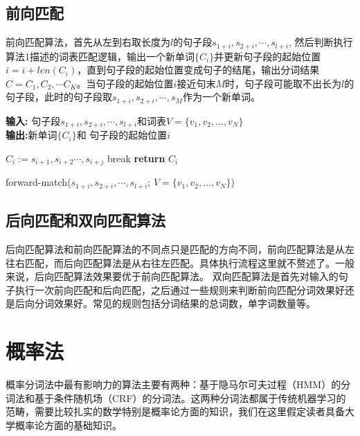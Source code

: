 \documentclass[twoside,a4paper,12pt]{book}%
\begin{document}
\subsection{前向匹配}
前向匹配算法，首先从左到右取长度为$l$的句子段$s_{1+i},s_{2+i},\cdots,s_{l+i}$, 然后判断执行算法1描述的词表匹配逻辑，输出一个新单词$\{C_i\}$并更新句子段的起始位置$i=i + len(C_i)$，直到句子段的起始位置变成句子的结尾，输出分词结果$C=C_1,C_2, \cdots C_K$。当句子段的起始位置$i$接近句末$M$时，句子段可能取不出长为$l$的句子段，此时的句子段取$s_{1+i},s_{2+i},\cdots,s_{M}$作为一个新单词。
\begin{algorithm}[h]
    \textbf{输入:} 句子段$s_{1+i},s_{2+i},\cdots,s_{l+i}$和词表$V=\{v_1,v_2,\dots,v_N\}$\\
    \textbf{输出:}新单词$\{C_i\}$和 句子段的起始位置$i$
    \begin{algorithmic}[1]
     \label{algline:end} 
         \STATE $C_i:=s_{i+1},s_{i+2}\cdots,s_{i+j}$
         \STATE break \label{algline:break}
        \ENDIF  
    \ENDFOR \label{algline:endfor}
    \STATE \textbf{return} $C_i$ \label{algline:return}
    \end{algorithmic}
    \caption{forward-match($s_{1+i},s_{2+i},\cdots,s_{l+i}$; $V=\{v_1,v_2,\dots,v_N\}$)}
    \label{alg:alg1}
\end{algorithm}
\subsection{后向匹配和双向匹配算法}
后向匹配算法和前向匹配算法的不同点只是匹配的方向不同，前向匹配算法是从左往右匹配，而后向匹配算法是从右往左匹配。具体执行流程这里就不赘述了。一般来说，后向匹配算法效果要优于前向匹配算法。
双向匹配算法是首先对输入的句子执行一次前向匹配和后向匹配，之后通过一些规则来判断前向匹配分词效果好还是后向分词效果好。常见的规则包括分词结果的总词数，单字词数量等。

\section{概率法}
概率分词法中最有影响力的算法主要有两种：基于隐马尔可夫过程（\gls{HMM}）的分词法和基于条件随机场（\gls{CRF}）的分词法。这两种分词法都属于传统机器学习的范畴，需要比较扎实的数学特别是概率论方面的知识，我们在这里假定读者具备大学概率论方面的基础知识。
\end{document}
